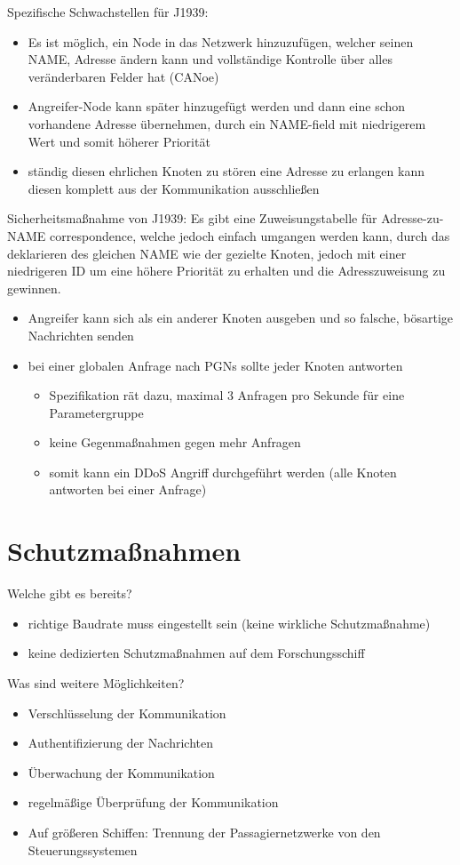 Spezifische Schwachstellen für J1939:
\begin{itemize}
    \item Es ist möglich, ein Node in das Netzwerk hinzuzufügen, welcher seinen NAME, Adresse ändern kann und vollständige Kontrolle über alles veränderbaren Felder hat (CANoe)
    \item Angreifer-Node kann später hinzugefügt werden und dann eine schon vorhandene Adresse übernehmen, durch ein NAME-field mit niedrigerem Wert und somit höherer Priorität
    \item ständig diesen ehrlichen Knoten zu stören eine Adresse zu erlangen kann diesen komplett aus der Kommunikation ausschließen
\end{itemize}
Sicherheitsmaßnahme von J1939:
Es gibt eine Zuweisungstabelle für Adresse-zu-NAME correspondence, welche jedoch einfach umgangen werden
kann, durch das deklarieren des gleichen NAME wie der gezielte Knoten, jedoch mit einer niedrigeren ID
um eine höhere Priorität zu erhalten und die Adresszuweisung zu gewinnen.
\begin{itemize}
    \item Angreifer kann sich als ein anderer Knoten ausgeben und so falsche, bösartige Nachrichten senden
    \item bei einer globalen Anfrage nach PGNs sollte jeder Knoten antworten
    \begin{itemize}
        \item Spezifikation rät dazu, maximal 3 Anfragen pro Sekunde für eine Parametergruppe
        \item keine Gegenmaßnahmen gegen mehr Anfragen
        \item somit kann ein DDoS Angriff durchgeführt werden (alle Knoten antworten bei einer Anfrage)
    \end{itemize}
\end{itemize}

\cite{Murvay2018}

\section{Schutzmaßnahmen}
Welche gibt es bereits?
\begin{itemize}
    \item richtige Baudrate muss eingestellt sein (keine wirkliche Schutzmaßnahme)
    \item keine dedizierten Schutzmaßnahmen auf dem Forschungsschiff
\end{itemize}
Was sind weitere Möglichkeiten?
\begin{itemize}
    \item Verschlüsselung der Kommunikation
    \item Authentifizierung der Nachrichten
    \item Überwachung der Kommunikation
    \item regelmäßige Überprüfung der Kommunikation
    \item Auf größeren Schiffen: Trennung der Passagiernetzwerke von den Steuerungssystemen
\end{itemize}

